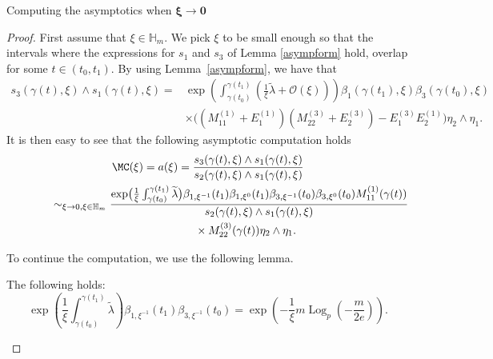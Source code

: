 \begin{subsubsection}{Computing the asymptotics when $\boldsymbol{\xi \to 0}$}
\begin{proof}
First assume that $\xi \in \mathbb{H}_m$. We pick $\xi$ to be small enough so that the intervals where the expressions for $s_1$ and $s_3$ of Lemma \ref{asympform} hold, overlap for some $t\in (t_0,t_1)$. By using Lemma~\ref{asympform}, we have that
\begin{align*}
 s_3(\gamma(t),\xi)\wedge s_1(\gamma(t),\xi)
 ={}& \exp \left(\int_{\gamma(t_0)}^{\gamma(t_1)}\left(\frac{1}{\xi}\widetilde{\lambda}+\mathcal{O}(\xi)\right)\right)\beta_1(\gamma(t_1),\xi)\beta_3(\gamma(t_0),\xi)\\
 &\times\bigl((M^{(1)}_{11}+E_{1}^{(1)})(M_{22}^{(3)}+E_{2}^{(3)})-E_1^{(3)}E_2^{(1)}\bigr)\eta_2\wedge \eta_1.
\end{align*}
It is then easy to see that the following asymptotic computation holds
\begin{gather*}
 \MC(\xi)=a(\xi)=\frac{s_3(\gamma(t),\xi)\wedge s_1(\gamma(t),\xi)}{s_2(\gamma(t),\xi)\wedge s_1(\gamma(t),\xi)}\\
 \phantom{ \MC(\xi)=}{}\sim_{\xi \to 0, \xi \in \mathbb{H}_m}\frac{\exp \bigl(\frac{1}{\xi}\int_{\gamma(t_0)}^{\gamma(t_1)}\widetilde{\lambda}\bigr)\beta_{1,\xi^{-1}}(t_1)\beta_{1,\xi^{0}}
 (t_1)\beta_{3,\xi^{-1}}(t_0)\beta_{3,\xi^{0}}(t_0)M_{11}^{(1)}(\gamma(t))}{s_2(\gamma(t),\xi)\wedge s_1(\gamma(t),\xi)}\\
\phantom{\qquad\sim_{\xi \to 0, \xi \in \mathbb{H}_m}}{} \times M_{22}^{(3)}(\gamma(t))\eta_2\wedge \eta_1.
\end{gather*}

To continue the computation, we use the following lemma.

\begin{Lemma}\label{auxasylemma} The following holds:
\begin{equation*}
 \exp \left(\frac{1}{\xi}\int_{\gamma(t_0)}^{\gamma(t_1)}\widetilde{\lambda}\right)\beta_{1,\xi^{-1}}(t_1)\beta_{3,\xi^{-1}}(t_0)
 =\exp \left(-\frac{1}{\xi}m\operatorname{Log}_p\left(-\frac{m}{2e}\right)\right).
\end{equation*}


\end{Lemma}


\end{proof}
\end{subsubsection}

